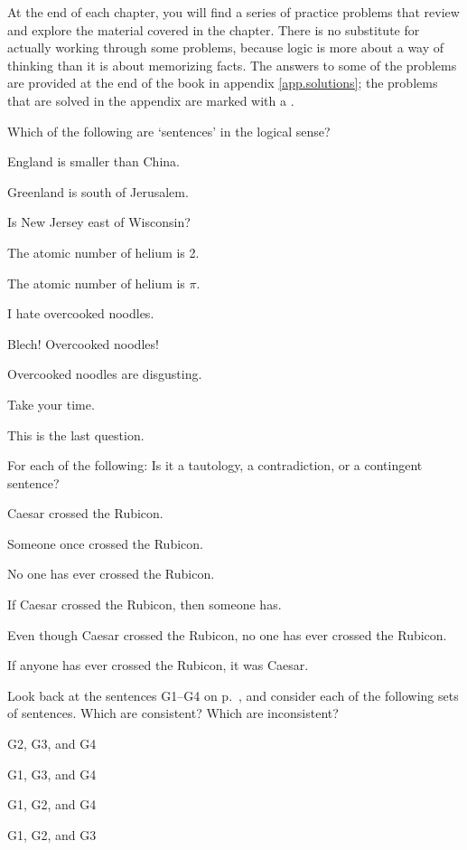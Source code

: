 \practiceproblems
At the end of each chapter, you will find a series of practice problems that review and explore the material covered in the chapter. There is no substitute for actually working through some problems, because logic is more about a way of thinking than it is about memorizing facts. The answers to some of the problems are provided at the end of the book in appendix \ref{app.solutions}; the problems that are solved in the appendix are marked with a \solutions.

\solutions
\problempart
\label{pr.Sentences1}
Which of the following are `sentences' in the logical sense?
\begin{earg}
\item England is smaller than China.
\item Greenland is south of Jerusalem.
\item Is New Jersey east of Wisconsin?
\item The atomic number of helium is 2.
\item The atomic number of helium is $\pi$.
\item I hate overcooked noodles.
\item Blech! Overcooked noodles!
\item Overcooked noodles are disgusting.
\item Take your time.
\item This is the last question.
\end{earg}


\problempart
\label{pr.EnglishTautology}
For each of the following: Is it a tautology, a contradiction, or a contingent sentence?
\begin{earg}
\item Caesar crossed the Rubicon.
\item Someone once crossed the Rubicon.
\item No one has ever crossed the Rubicon.
\item If Caesar crossed the Rubicon, then someone has.
\item Even though Caesar crossed the Rubicon, no one has ever crossed the Rubicon.
\item If anyone has ever crossed the Rubicon, it was Caesar.
\end{earg}

\solutions
\problempart
\label{pr.MartianGiraffes}
Look back at the sentences G1--G4 on p.~\pageref{MartianGiraffes}, and consider each of the following sets of sentences. Which are consistent? Which are inconsistent?
\begin{earg}
\item G2, G3, and G4
\item G1, G3, and G4
\item G1, G2, and G4
\item G1, G2, and G3
\end{earg}


